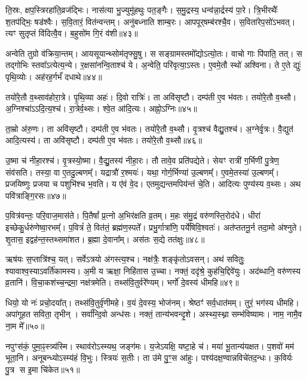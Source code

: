 ति॒स्रः, क्षप॒स्त्रिरहा॑ति॒व्रज॑द्भिः। नास॑त्या भु॒ज्युमू॑हथुः पत॒ङ्गैः। 
स॒मु॒द्रस्य॒ धन्व॑न्ना॒र्द्रस्य॑ पा॒रे। त्रि॒भीरथैः᳚ श॒तप॑द्भिः॒ षड॑श्वैः। 
स॒वि॒तारं॒ वित॑न्वन्तम्। अनु॑बध्नाति शाम्ब॒रः। आपपूर्‌षम्ब॑रश्चै॒व। 
स॒विता॑रेप॒सो॑ऽभवत्। त्यꣳ सुतृप्तं वि॑दित्वै॒व। ब॒हुसो॑म गि॒रं व॑शी॥४३॥

अन्वेति तुग्रो व॑क्रिया॒न्तम्। आयसूयान्थ्सोम॑तृफ्सु॒षु। स \linebreak सङ्ग्रामस्तमो᳚द्योऽत्यो॒तः। 
वाचो गाः पि॑पाति॒ तत्। स तद्गोभिः स्तवा᳚ऽत्येत्य॒न्ये। र॒क्षसा॑नन्वि॒ताश्च॑ ये। 
अ॒न्वेति॒ परि॑वृत्या॒ऽस्तः। ए॒वमे॒तौ स्थो॑ अश्विना। 
ते ए॒ते द्युः॑ पृथि॒व्योः। अह॑रह॒र्गर्भं॑ दधाथे॥४४॥

तयो॑रे॒तौ व॒थ्साव॑होरा॒त्रे। पृ॒थि॒व्या अहः॑। दि॒वो रात्रिः॑। 
ता अवि॑सृष्टौ। दम्प॑ती ए॒व भ॑वतः। तयो॑रे॒तौ व॒थ्सौ। 
अ॒ग्निश्चा॑ऽऽदि॒त्य॒श्च॑। रा॒त्रेर्व॒थ्सः। श्वे॒त आ॑दि॒त्यः। अह्नो॒ऽग्निः॥४५॥

ता॒म्रो अ॑रु॒णः। ता अवि॑सृष्टौ। दम्प॑ती ए॒व भ॑वतः। 
तयो॑रे॒तौ व॒थ्सौ। वृ॒त्रश्च॑ वैद्यु॒तश्च॑। अ॒ग्नेर्वृ॒त्रः। वै॒द्युत॑ आदि॒त्यस्य॑। 
ता अवि॑सृष्टौ। दम्प॑ती ए॒व भ॑वतः। तयो॑रे॒तौ व॒थ्सौ॥४६॥


उ॒ष्मा च॑ नीहा॒रश्च॑। वृ॒त्रस्यो॒ष्मा। वै॒द्यु॒तस्य॑ नीहा॒रः। 
तौ तावे॒व प्रति॑पद्येते। सेयꣳ रात्री॑ ग॒र्भिणी॑ पु॒त्रेण॒ संव॑सति। 
तस्या॒ वा ए॒तदु॒ल्बणम्‌᳚। यद्रात्रौ॑ र॒श्मयः॑। 
यथा॒ गोर्ग॒र्भिण्या॑ उ॒ल्बणम्‌᳚। ए॒वमे॒तस्या॑ उ॒ल्बणम्‌᳚। 
प्रजयिष्णुः प्रजया च पशुभि॑श्च भ॒वति। 
य ए॑वं वे॒द। एतमुद्यन्तमपिय॑न्तं चे॒ति। 
आदित्यः पुण्य॑स्य व॒थ्सः। अथ पवि॑त्राङ्गि॒रसः॥४७॥\anuvakamend


प॒वित्र॑वन्तः॒ परि॒वाज॒मास॑ते। पि॒तैषां᳚ प्र॒त्नो अ॒भिर॑क्षति व्र॒तम्। 
म॒हः स॑मु॒द्रं वरु॑णस्ति॒रोद॑धे। धीरा॑ इच्छेकु॒र्धरु॑णेष्वा॒रभम्‌᳚। 
प॒वित्रं॑ ते॒ वित॑तं॒ ब्रह्म॑ण॒स्पते᳚। प्रभु॒र्गात्रा॑णि॒ पर्ये॑षिवि॒श्वतः॑। 
अत॑प्ततनू॒र्न तदा॒मो अ॑श्नुते। शृ॒तास॒ इद्वह॑न्त॒स्तथ्समा॑शत। 
ब्र॒ह्मा दे॒वाना᳚म्। अस॑तः स॒द्ये तत॑क्षुः॥४८॥


ऋष॑यः स॒प्तात्रि॑श्च॒ यत्। सर्वेऽत्रयो अ॑गस्त्य॒श्च। 
नक्ष॑त्रैः॒ शङ्कृ॑तोऽवसन्। अथ॑ सवितुः॒ श्यावाश्व॒स्याऽवर्ति॑कामस्य। 
अ॒मी य ऋक्षा॒ निहि॑तास उ॒च्चा। नक्तं॒ ददृ॑श्रे॒ कुह॑चि॒द्दिवे॑युः। 
अद॑ब्धानि॒ वरु॑णस्य व्र॒तानि॑। वि॒चा॒कश॑च्च॒न्द्रमा॒ नक्ष॑त्रमेति। 
तथ्स॑वि॒तुर्वरे᳚ण्यम्। भर्गो॑ दे॒वस्य॑ धीमहि॥४९॥


धियो॒ यो नः॑ प्रचो॒दया᳚त्। तथ्स॑वि॒तुर्वृ॑णीमहे। 
व॒यं दे॒वस्य॒ भोज॑नम्। श्रेष्ठꣳ॑ सर्व॒धात॑मम्। 
तुरं॒ भग॑स्य धीमहि। अपा॑गूहत सविता॒ तृभीन्। 
सर्वा᳚न्दि॒वो अन्ध॑सः। नक्तं॒ तान्य॑\-भवन्दृ॒शे। 
अस्थ्य॒स्थ्ना सम्भ॑विष्यामः। नाम॒ नामै॒व ना॒म मे᳚॥५०॥


नपुꣳस॑कं॒ पुमा॒ꣴ॒स्त्र्य॑स्मि। स्थाव॑रोऽस्म्यथ॒ जङ्ग॑मः। 
य॒जेऽयक्षि॒ यष्टा॒हे च॑। मया॑ भू॒तान्य॑यक्षत। 
प॒शवो॑ मम॑ भूता॒नि। अनूबन्ध्योऽस्म्य॑हं वि॒भुः। 
स्त्रियः॑ स॒तीः। ता उ॑मे पु॒ꣳ॒स आ॑हुः। 
पश्य॑दक्ष॒ण्वान्नविचे॑तद॒न्धः। क॒विर्यः पु॒त्र स इ॒मा चि॑केत॥५१॥


